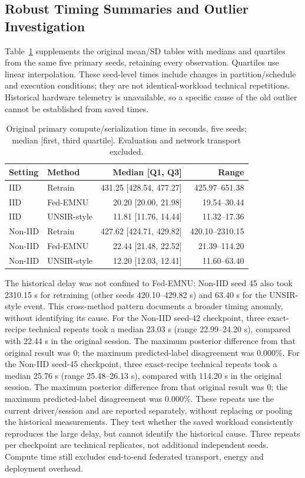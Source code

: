 \subsection{Robust Timing Summaries and Outlier Investigation}
\label{sec:round2-timing}
Table~\ref{tab:robust-time} supplements the original mean/SD tables with medians
and quartiles from the same five primary seeds, retaining every observation.
Quartiles use linear interpolation. These seed-level times include changes in
partition/schedule and execution conditions; they are not identical-workload
technical repetitions. Historical hardware telemetry is unavailable, so a
specific cause of the old outlier cannot be established from saved times.
\begin{table}[H]\centering\small
\caption{Original primary compute/serialization time in seconds, five seeds;
median [first, third quartile]. Evaluation and network transport excluded.}
\label{tab:robust-time}\begin{tabular}{llrr}\toprule
Setting & Method & Median [Q1, Q3] & Range\\\midrule
IID & Retrain & 431.25 [428.54, 477.27] & 425.97--651.38\\
IID & Fed-EMNU & 20.20 [20.00, 21.98] & 19.54--30.44\\
IID & UNSIR-style & 11.81 [11.76, 14.44] & 11.32--17.36\\
Non-IID & Retrain & 427.62 [424.71, 429.82] & 420.10--2310.15\\
Non-IID & Fed-EMNU & 22.44 [21.48, 22.52] & 21.39--114.20\\
Non-IID & UNSIR-style & 12.20 [12.03, 12.41] & 11.60--63.40\\
\bottomrule\end{tabular}\end{table}
The historical delay was not confined to Fed-EMNU: Non-IID seed 45 also
took 2310.15 s for retraining (other seeds 420.10--429.82 s)
and 63.40 s for the UNSIR-style event. This cross-method pattern
documents a broader timing anomaly, without identifying its cause.
For the Non-IID seed-42 checkpoint, three exact-recipe technical repeats
took a median 23.03 s (range 22.99--24.20 s),
compared with 22.44 s in the original session.
The maximum posterior difference from that original result was 0;
the maximum predicted-label disagreement was 0.000\%.
For the Non-IID seed-45 checkpoint, three exact-recipe technical repeats
took a median 25.76 s (range 25.48--26.13 s),
compared with 114.20 s in the original session.
The maximum posterior difference from that original result was 0;
the maximum predicted-label disagreement was 0.000\%.
These repeats use the current driver/session and are reported separately,
without replacing or pooling the historical measurements. They test whether
the saved workload consistently reproduces the large delay, but cannot identify
the historical cause. Three repeats per checkpoint are technical replicates,
not additional independent seeds. Compute time still excludes end-to-end
federated transport, energy and deployment overhead.
